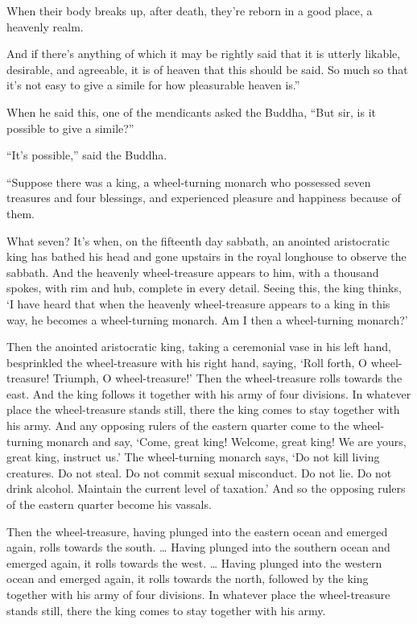 \documentclass[12pt,openany]{book}%
\begin{document}
When their body breaks up, after death, they’re reborn in a good place, a heavenly realm. 

And if there’s anything of which it may be rightly said that it is utterly likable, desirable, and agreeable, it is of heaven that this should be said. So much so that it’s not easy to give a simile for how pleasurable heaven is.” 

When he said this, one of the mendicants asked the Buddha, “But sir, is it possible to give a simile?” 

“It’s possible,” said the Buddha. 

“Suppose there was a king, a wheel-turning monarch who possessed seven treasures and four blessings, and experienced pleasure and happiness because of them. 

What seven? It’s when, on the fifteenth day sabbath, an anointed aristocratic king has bathed his head and gone upstairs in the royal longhouse to observe the sabbath. And the heavenly wheel-treasure appears to him, with a thousand spokes, with rim and hub, complete in every detail. Seeing this, the king thinks, ‘I have heard that when the heavenly wheel-treasure appears to a king in this way, he becomes a wheel-turning monarch. Am I then a wheel-turning monarch?’ 

Then the anointed aristocratic king, taking a ceremonial vase in his left hand, besprinkled the wheel-treasure with his right hand, saying, ‘Roll forth, O wheel-treasure! Triumph, O wheel-treasure!’ Then the wheel-treasure rolls towards the east. And the king follows it together with his army of four divisions. In whatever place the wheel-treasure stands still, there the king comes to stay together with his army. And any opposing rulers of the eastern quarter come to the wheel-turning monarch and say, ‘Come, great king! Welcome, great king! We are yours, great king, instruct us.’ The wheel-turning monarch says, ‘Do not kill living creatures. Do not steal. Do not commit sexual misconduct. Do not lie. Do not drink alcohol. Maintain the current level of taxation.’ And so the opposing rulers of the eastern quarter become his vassals. 

Then the wheel-treasure, having plunged into the eastern ocean and emerged again, rolls towards the south. … Having plunged into the southern ocean and emerged again, it rolls towards the west. … Having plunged into the western ocean and emerged again, it rolls towards the north, followed by the king together with his army of four divisions. In whatever place the wheel-treasure stands still, there the king comes to stay together with his army. 
\end{document}
